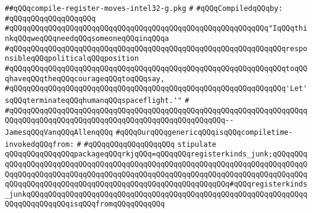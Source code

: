 \label{src/lib/compiler/back/low/intel32/code/compile-register-moves-intel32-g.pkg}
\verb|##qQQqcompile-register-moves-intel32-g.pkg|\newline
\verb|#|\newline
\newline
\verb|#qQQqCompiledqQQqby:|\newline
\verb|#qQQqqQQqqQQqqQQqqQQq|\newline
\newline
\newline
\newline
\verb|#qQQqqQQqqQQqqQQqqQQqqQQqqQQqqQQqqQQqqQQqqQQqqQQqqQQqqQQqqQQq"IqQQqthinkqQQqweqQQqneedqQQqsomeoneqQQqinqQQqa|\newline
\verb|#qQQqqQQqqQQqqQQqqQQqqQQqqQQqqQQqqQQqqQQqqQQqqQQqqQQqqQQqqQQqqQQqresponsibleqQQqpoliticalqQQqposition|\newline
\verb|#qQQqqQQqqQQqqQQqqQQqqQQqqQQqqQQqqQQqqQQqqQQqqQQqqQQqqQQqqQQqqQQqtoqQQqhaveqQQqtheqQQqcourageqQQqtoqQQqsay,|\newline
\verb|#qQQqqQQqqQQqqQQqqQQqqQQqqQQqqQQqqQQqqQQqqQQqqQQqqQQqqQQqqQQqqQQq'Let'sqQQqterminateqQQqhumanqQQqspaceflight.'"|\newline
\verb|#|\newline
\verb|#qQQqqQQqqQQqqQQqqQQqqQQqqQQqqQQqqQQqqQQqqQQqqQQqqQQqqQQqqQQqqQQqqQQqqQQqqQQqqQQqqQQqqQQqqQQqqQQqqQQqqQQqqQQqqQQqqQQqqQQq--JamesqQQqVanqQQqAllenqQQq|\newline
\newline
\newline
\verb|#qQQqOurqQQqgenericqQQqisqQQqcompiletime-invokedqQQqfrom:|\newline
\verb|#|\newline
\verb|#qQQqqQQqqQQqqQQqqQQq|\newline
\newline
\verb|stipulate|\newline
\verb|qQQqqQQqqQQqqQQqpackageqQQqrkjqQQq=qQQqqQQqregisterkinds_junk;qQQqqQQqqQQqqQQqqQQqqQQqqQQqqQQqqQQqqQQqqQQqqQQqqQQqqQQqqQQqqQQqqQQqqQQqqQQqqQQqqQQqqQQqqQQqqQQqqQQqqQQqqQQqqQQqqQQqqQQqqQQqqQQqqQQqqQQqqQQqqQQqqQQqqQQqqQQqqQQqqQQqqQQqqQQqqQQqqQQqqQQqqQQqqQQqqQQqqQQq#qQQqregisterkinds_junkqQQqqQQqqQQqqQQqqQQqqQQqqQQqqQQqqQQqqQQqqQQqqQQqqQQqqQQqqQQqqQQqqQQqqQQqqQQqqQQqisqQQqfromqQQqqQQqqQQq|\newline
